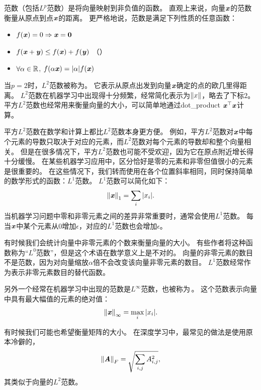 

范数（包括$L^p$范数）是将向量映射到非负值的函数。
直观上来说，向量$\boldsymbol{\mathit{x}}$的范数衡量从原点到点$\boldsymbol{\mathit{x}}$的距离。
更严格地说，范数是满足下列性质的任意函数：
\begin{itemize}
\item $f(\boldsymbol{\mathit{x}}) = 0 \Rightarrow \boldsymbol{\mathit{x}} = \mathbf{0}$ 
\item $f(\boldsymbol{\mathit{x}} + \boldsymbol{\mathit{y}}) \leq f(\boldsymbol{\mathit{x}}) + f(\boldsymbol{\mathit{y}})$ （）
\item $\forall \alpha \in \mathbb{R}$, $f(\alpha \boldsymbol{\mathit{x}}) = |\alpha| f(\boldsymbol{\mathit{x}})$
\end{itemize}


当$p=2$时，$L^2$范数被称为。
它表示从原点出发到向量$\boldsymbol{\mathit{x}}$确定的点的欧几里得距离。
$L^2$范数在机器学习中出现得十分频繁，经常简化表示为$\left\lVert x\right\rVert$，略去了下标$2$。
平方$L^2$范数也经常用来衡量向量的大小，可以简单地通过\gls{dot_product} $\boldsymbol{\mathit{x}}^\top\boldsymbol{\mathit{x}}$计算。


平方$L^2$范数在数学和计算上都比$L^2$范数本身更方便。
例如，平方$L^2$范数对$\boldsymbol{\mathit{x}}$中每个元素的导数只取决于对应的元素，而$L^2$范数对每个元素的导数却和整个向量相关。
但是在很多情况下，平方$L^2$范数也可能不受欢迎，因为它在原点附近增长得十分缓慢。
在某些机器学习应用中，区分恰好是零的元素和非零但值很小的元素是很重要的。
在这些情况下，我们转而使用在各个位置斜率相同，同时保持简单的数学形式的函数：$L^1$范数。
$L^1$范数可以简化如下：
\begin{equation}
    \left\lVert\boldsymbol{\mathit{x}}\right\rVert_1 = \sum_i  |x_i|.
\end{equation}
当机器学习问题中零和非零元素之间的差异非常重要时，通常会使用$L^1$范数。
每当$\boldsymbol{\mathit{x}}$中某个元素从$0$增加$\epsilon$，对应的$L^1$范数也会增加$\epsilon$。


有时候我们会统计向量中非零元素的个数来衡量向量的大小。
有些作者将这种函数称为``$L^0$范数''，但是这个术语在数学意义上是不对的。
向量的非零元素的数目不是范数，因为对向量缩放$\alpha$倍不会改变该向量非零元素的数目。
$L^1$范数经常作为表示非零元素数目的替代函数。





另外一个经常在机器学习中出现的范数是$L^\infty$范数，也被称为\,。
这个范数表示向量中具有最大幅值的元素的绝对值：
\begin{equation}
    \left\lVert\boldsymbol{\mathit{x}}\right\rVert_\infty = \max_i |x_i|.
\end{equation}


有时候我们可能也希望衡量矩阵的大小。
在深度学习中，最常见的做法是使用原本冷僻的，
\begin{equation}
    \left\lVert\boldsymbol{\mathit{A}}\right\rVert_F = \sqrt{\sum_{i,j} A_{i,j}^2}, 
\end{equation}
其类似于向量的$L^2$范数。


